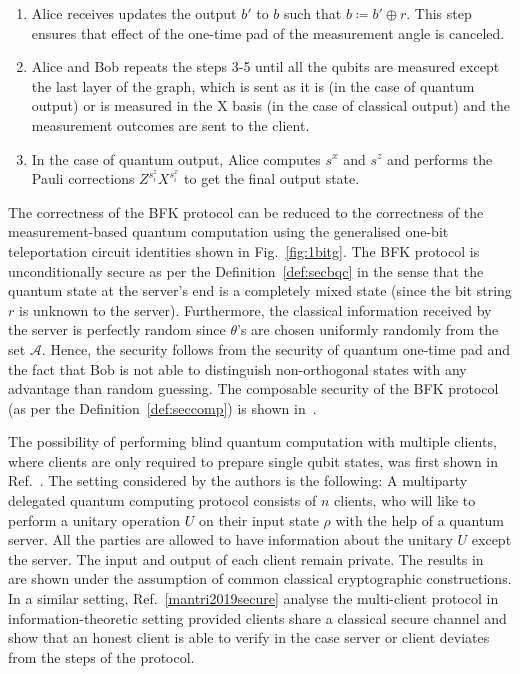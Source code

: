 \begin{enumerate}
\item Alice receives updates the output $b'$ to $b$ such that $b\coloneqq b'\oplus r $. This step ensures that effect of the one-time pad of the measurement angle is canceled.  
\item Alice and Bob repeats the steps 3-5 until all the qubits are measured except the last layer of the graph, which is sent as it is (in the case of quantum output) or is measured in the X basis (in the case of classical output) and the measurement outcomes are sent to the client.  
\item In the case of quantum output, Alice computes $s^{x}$ and $s^{z}$ and performs the Pauli corrections $Z^{s^{z}_i}X^{s^{x}_i}$ to get the final output state.     
\end{enumerate}
The correctness of the BFK protocol can be reduced to the correctness of the measurement-based quantum computation using the generalised one-bit teleportation circuit identities shown in Fig.~\ref{fig:1bitg}. The BFK protocol is unconditionally secure as per the Definition~\ref{def:secbqc} in the sense that the quantum state at the server's end is a completely mixed state (since the bit string $r$ is unknown to the server).  Furthermore, the classical information received by the server is perfectly random since $\theta$'s are chosen uniformly randomly from the set $\mathcal{A}$.  Hence, the security follows from the security of quantum one-time pad and the fact that Bob is not able to distinguish non-orthogonal states with any advantage than random guessing. The composable security of the BFK protocol (as per the Definition~\ref{def:seccomp}) is shown in~\cite{dunjko2014composable}.


The possibility of performing blind quantum computation with multiple clients, where clients are only required to prepare single qubit states, was first shown in Ref.~\cite{kashefi2016blind}. The setting considered by the authors is the following:  A multiparty delegated quantum computing protocol consists of $n$  clients, who will like to perform a unitary operation $U$ on their input state $\rho$ with the help of a quantum server. All the parties are allowed to have information about the unitary $U$ except the server. The input and output of each client remain private. The results in~\cite{kashefi2016blind} are shown under the assumption of common classical cryptographic constructions. In a similar setting, Ref.~\ref{mantri2019secure} analyse the multi-client protocol in information-theoretic setting provided clients share a classical secure channel and show that an honest client is able to verify in the case server or client deviates from the steps of the protocol. 

